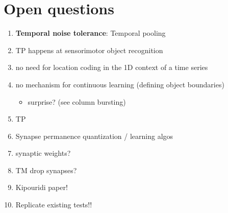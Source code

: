 \documentclass[a4paper,10pt]{article}
\begin{document}
\section{Open questions}
\begin{enumerate}
  \item \textbf{Temporal noise tolerance}: Temporal pooling
  \item TP happens at sensorimotor object recognition
  \item no need for location coding in the 1D context of a time series
  \item no mechanism for continuous learning (defining object boundaries)
      \begin{itemize}
        \item surprise? (see column bursting)
      \end{itemize}
  \item TP
  \item Synapse permanence quantization / learning algos
  \item synaptic weights?
  \item TM drop synapses?
  \item Kipouridi paper!
  \item Replicate existing tests!!
\end{enumerate}
\end{document}

